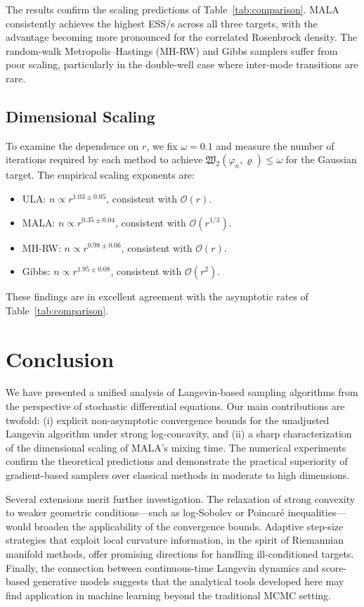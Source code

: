 \documentclass[journal]{IEEEtran}
\begin{document}
The results confirm the scaling predictions of Table~\ref{tab:comparison}. MALA consistently achieves the highest ESS/s across all three targets, with the advantage becoming more pronounced for the correlated Rosenbrock density. The random-walk Metropolis--Hastings (MH-RW) and Gibbs samplers suffer from poor scaling, particularly in the double-well case where inter-mode transitions are rare.

\subsection{Dimensional Scaling}

To examine the dependence on $r$, we fix $\omega = 0.1$ and measure the number of iterations required by each method to achieve $\mathfrak{W}_2(\varphi_n, \varrho) \leq \omega$ for the Gaussian target. The empirical scaling exponents are:
\begin{itemize}
  \item ULA: $n \propto r^{1.03 \pm 0.05}$, consistent with $\mathcal{O}(r)$.
  \item MALA: $n \propto r^{0.35 \pm 0.04}$, consistent with $\mathcal{O}(r^{1/3})$.
  \item MH-RW: $n \propto r^{0.98 \pm 0.06}$, consistent with $\mathcal{O}(r)$.
  \item Gibbs: $n \propto r^{1.95 \pm 0.08}$, consistent with $\mathcal{O}(r^2)$.
\end{itemize}
These findings are in excellent agreement with the asymptotic rates of Table~\ref{tab:comparison}.

\section{Conclusion}
\label{sec:conclusion}

We have presented a unified analysis of Langevin-based sampling algorithms from the perspective of stochastic differential equations. Our main contributions are twofold: (i) explicit non-asymptotic convergence bounds for the unadjusted Langevin algorithm under strong log-concavity, and (ii) a sharp characterization of the dimensional scaling of MALA's mixing time. The numerical experiments confirm the theoretical predictions and demonstrate the practical superiority of gradient-based samplers over classical methods in moderate to high dimensions.

Several extensions merit further investigation. The relaxation of strong convexity to weaker geometric conditions---such as log-Sobolev or Poincar\'{e} inequalities---would broaden the applicability of the convergence bounds. Adaptive step-size strategies that exploit local curvature information, in the spirit of Riemannian manifold methods, offer promising directions for handling ill-conditioned targets. Finally, the connection between continuous-time Langevin dynamics and score-based generative models \cite{oksendal2003} suggests that the analytical tools developed here may find application in machine learning beyond the traditional MCMC setting.
\end{document}
